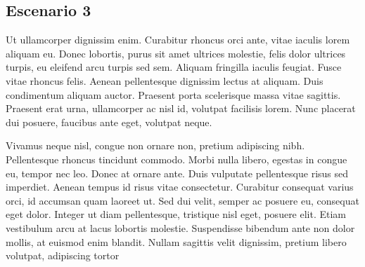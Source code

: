 \documentclass[a4paper, 10pt, twoside]{article}
\begin{document}
\subsection{Escenario 3}

Ut ullamcorper dignissim enim. Curabitur rhoncus orci ante, vitae iaculis lorem aliquam eu. Donec lobortis, purus sit amet ultrices molestie, felis dolor ultrices turpis, eu eleifend arcu turpis sed sem. Aliquam fringilla iaculis feugiat. Fusce vitae rhoncus felis. Aenean pellentesque dignissim lectus at aliquam. Duis condimentum aliquam auctor. Praesent porta scelerisque massa vitae sagittis. Praesent erat urna, ullamcorper ac nisl id, volutpat facilisis lorem. Nunc placerat dui posuere, faucibus ante eget, volutpat neque.

Vivamus neque nisl, congue non ornare non, pretium adipiscing nibh. Pellentesque rhoncus tincidunt commodo. Morbi nulla libero, egestas in congue eu, tempor nec leo. Donec at ornare ante. Duis vulputate pellentesque risus sed imperdiet. Aenean tempus id risus vitae consectetur. Curabitur consequat varius orci, id accumsan quam laoreet ut. Sed dui velit, semper ac posuere eu, consequat eget dolor. Integer ut diam pellentesque, tristique nisl eget, posuere elit. Etiam vestibulum arcu at lacus lobortis molestie. Suspendisse bibendum ante non dolor mollis, at euismod enim blandit. Nullam sagittis velit dignissim, pretium libero volutpat, adipiscing tortor
\end{document}
